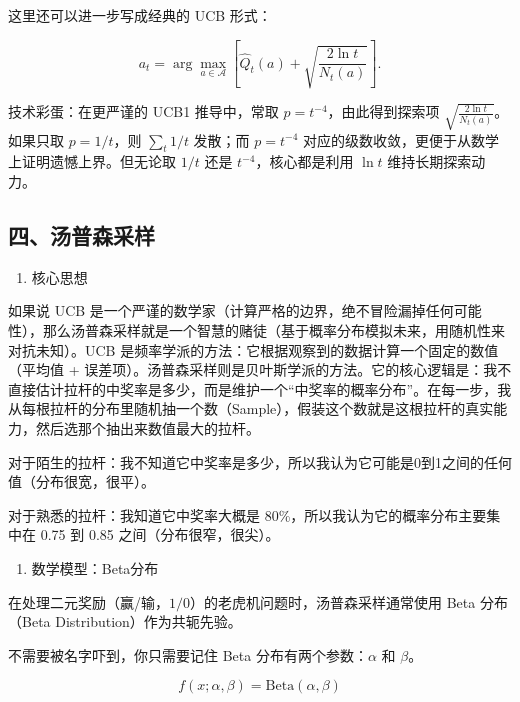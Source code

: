 这里还可以进一步写成经典的 UCB 形式：

\[
a_t=\arg\max_{a\in\mathcal{A}}[\hat{Q}_t(a)+\sqrt{\frac{2\ln t}{N_t(a)}}].
\]

技术彩蛋：在更严谨的 UCB1 推导中，常取 \(p=t^{-4}\)，由此得到探索项 \(\sqrt{\frac{2\ln t}{N_t(a)}}\)。如果只取 \(p=1/t\)，则 \(\sum_t 1/t\) 发散；而 \(p=t^{-4}\) 对应的级数收敛，更便于从数学上证明遗憾上界。但无论取 \(1/t\) 还是 \(t^{-4}\)，核心都是利用 \(\ln t\) 维持长期探索动力。

\hypertarget{ux56dbux6c64ux666eux68eeux91c7ux6837}{%
\subsection{四、汤普森采样}\label{ux56dbux6c64ux666eux68eeux91c7ux6837}}

\begin{enumerate}
\def\labelenumi{\arabic{enumi}.}
\tightlist
\item
  核心思想
\end{enumerate}

如果说 UCB 是一个严谨的数学家（计算严格的边界，绝不冒险漏掉任何可能性），那么汤普森采样就是一个智慧的赌徒（基于概率分布模拟未来，用随机性来对抗未知）。UCB 是频率学派的方法：它根据观察到的数据计算一个固定的数值（平均值 + 误差项）。汤普森采样则是贝叶斯学派的方法。它的核心逻辑是：我不直接估计拉杆的中奖率是多少，而是维护一个``中奖率的概率分布''。在每一步，我从每根拉杆的分布里随机抽一个数（Sample），假装这个数就是这根拉杆的真实能力，然后选那个抽出来数值最大的拉杆。

对于陌生的拉杆：我不知道它中奖率是多少，所以我认为它可能是0到1之间的任何值（分布很宽，很平）。

对于熟悉的拉杆：我知道它中奖率大概是 80\%，所以我认为它的概率分布主要集中在 0.75 到 0.85 之间（分布很窄，很尖）。

\begin{enumerate}
\def\labelenumi{\arabic{enumi}.}
\setcounter{enumi}{1}
\tightlist
\item
  数学模型：Beta分布
\end{enumerate}

在处理二元奖励（赢/输，\(1/0\)）的老虎机问题时，汤普森采样通常使用 Beta 分布（Beta Distribution）作为共轭先验。

不需要被名字吓到，你只需要记住 Beta 分布有两个参数：\(\alpha\) 和 \(\beta\)。

\[
f(x;\alpha,\beta)=\mathrm{Beta}(\alpha,\beta)
\]

